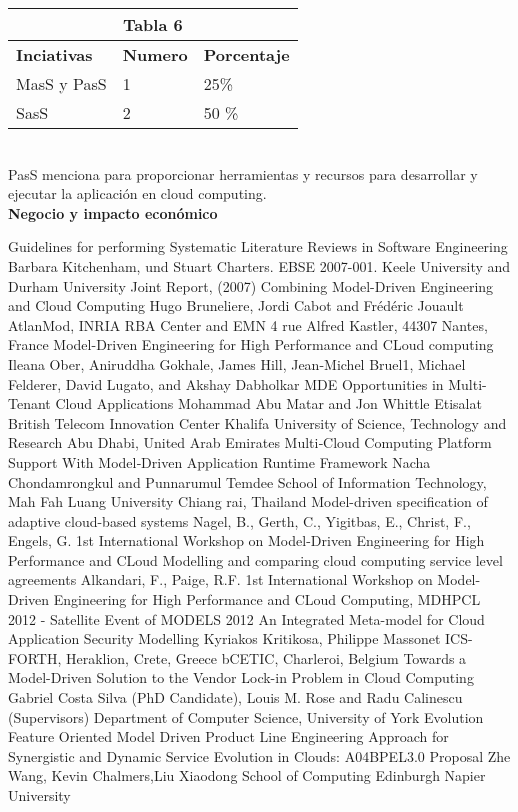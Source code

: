 \documentclass{llncs}
\begin{document}
\begin{tabular}{  | p{4cm} | p{2cm} |  | p{3cm} | }
  \hline
  \multicolumn{3}{|c|}{\bf Tabla 6} \\
  \hline
    \bf Inciativas  & \bf Numero & \bf Porcentaje  \\
  \hline
  MasS y PasS & 1  &25\%  \\
   \hline
    SasS & 2 & 50 \% \\
   \hline
\end{tabular}
\\
PasS menciona para proporcionar herramientas y recursos para desarrollar y ejecutar la aplicación en cloud computing. \\

\bf Negocio y impacto económico \\


\begin{thebibliography}{1}
Guidelines for performing Systematic Literature Reviews in Software Engineering
Barbara Kitchenham, und Stuart Charters. EBSE 2007-001. Keele University and Durham University Joint Report, (2007)
Combining Model-Driven Engineering and Cloud Computing
Hugo Bruneliere, Jordi Cabot and Frédéric Jouault AtlanMod, INRIA RBA Center and EMN
4 rue Alfred Kastler, 44307 Nantes, France
\bibitem{}
Model-Driven Engineering for High Performance and CLoud computing
Ileana Ober, Aniruddha Gokhale, James Hill, Jean-Michel Bruel1, Michael Felderer, David Lugato, and Akshay Dabholkar
\bibitem{}
MDE Opportunities in Multi-Tenant Cloud Applications
Mohammad Abu Matar and Jon Whittle
Etisalat British Telecom Innovation Center Khalifa University of Science, Technology and Research Abu Dhabi, United Arab Emirates
\bibitem{}
Multi‐Cloud Computing Platform Support
With Model‐Driven Application Runtime Framework
Nacha Chondamrongkul and Punnarumul Temdee
School of Information Technology, Mah Fah Luang University Chiang rai, Thailand
\bibitem{}
Model-driven specification of adaptive cloud-based systems
Nagel, B., Gerth, C., Yigitbas, E., Christ, F., Engels, G.
 1st International Workshop on Model-Driven Engineering for High Performance and CLoud
\bibitem{}
Modelling and comparing cloud computing service level agreements
Alkandari, F., Paige, R.F.
 1st International Workshop on Model-Driven Engineering for High Performance and CLoud
Computing, MDHPCL 2012 - Satellite Event of MODELS 2012
\bibitem{}
An Integrated Meta-model for Cloud Application Security Modelling
Kyriakos Kritikosa, Philippe Massonet
ICS-FORTH, Heraklion, Crete, Greece bCETIC, Charleroi, Belgium
\bibitem{}
Towards a Model-Driven Solution to the Vendor Lock-in Problem in Cloud Computing
Gabriel Costa Silva (PhD Candidate), Louis M. Rose and Radu Calinescu (Supervisors)
Department of Computer Science, University of York
\bibitem{}
Evolution Feature Oriented Model Driven
Product Line Engineering Approach for Synergistic and Dynamic Service
Evolution in Clouds: A04BPEL3.0 Proposal
Zhe Wang, Kevin Chalmers,Liu Xiaodong
School of Computing Edinburgh Napier University
\end{thebibliography}
\end{document}
